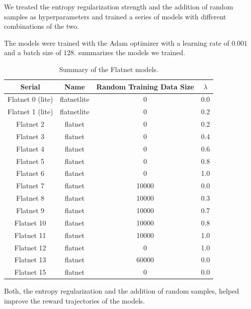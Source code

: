 We treated the entropy regularization strength and the addition of random samples as hyperparameters and trained a series of models with different combinations of the two.

The models were trained with the Adam optimizer \citep{adam} with a learning rate of \(0.001\) and a batch size of \(128\).
 summarizes the models we trained.
\vspace{12pt}
\begin{table}[H]
    \centering
    \begin{tabularx}{0.7\textwidth}{c c c c}
    \hline
        Serial & Name & Random Training Data Size & \(\lambda\) \\ \hline
        Flatnet 0 (lite) & flatnetlite & 0 & 0.0 \\ \hline
        Flatnet 1 (lite) & flatnetlite & 0 & 0.2 \\ \hline
        Flatnet 2 & flatnet & 0 & 0.2 \\ \hline
        Flatnet 3 & flatnet & 0 & 0.4 \\ \hline
        Flatnet 4 & flatnet & 0 & 0.6 \\ \hline
        Flatnet 5 & flatnet & 0 & 0.8 \\ \hline
        Flatnet 6 & flatnet & 0 & 1.0 \\ \hline
        Flatnet 7 & flatnet & 10000 & 0.0 \\ \hline
        Flatnet 8 & flatnet & 10000 & 0.3 \\ \hline
        Flatnet 9 & flatnet & 10000 & 0.7 \\ \hline
        Flatnet 10 & flatnet & 10000 & 0.8 \\ \hline
        Flatnet 11 & flatnet & 10000 & 1.0 \\ \hline
        Flatnet 12 & flatnet & 0 & 1.0 \\ \hline
        Flatnet 13 & flatnet & 60000 & 0.0 \\ \hline
        Flatnet 15 & flatnet & 0 & 0.0 \\ \hline
    \end{tabularx}
    \caption{Summary of the Flatnet models.}
    \label{tab:flatnet-models}
\end{table}

Both, the entropy regularization and the addition of random samples, helped improve the reward trajectories of the models.


